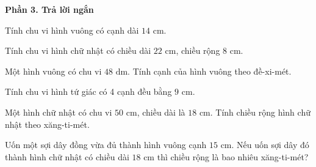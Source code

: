 \textbf{Phần 3. Trả lời ngắn}

\begin{ex} %
Tính chu vi hình vuông có cạnh dài $14\text{ cm}$.
\end{ex}

\begin{ex} %
Tính chu vi hình chữ nhật có chiều dài $22\text{ cm}$, chiều rộng $8\text{ cm}$.
\end{ex}

\begin{ex} %
Một hình vuông có chu vi $48\text{ dm}$. Tính cạnh của hình vuông theo đề-xi-mét.
\end{ex}

\begin{ex} %
Tính chu vi hình tứ giác có 4 cạnh đều bằng $9\text{ cm}$.
\end{ex}

\begin{ex} %
Một hình chữ nhật có chu vi $50\text{ cm}$, chiều dài là $18\text{ cm}$. Tính chiều rộng hình chữ nhật theo xăng-ti-mét.
\end{ex}

\begin{ex} %
Uốn một sợi dây đồng vừa đủ thành hình vuông cạnh $15\text{ cm}$. Nếu uốn sợi dây đó thành hình chữ nhật có chiều dài $18\text{ cm}$ thì chiều rộng là bao nhiêu xăng-ti-mét?
\end{ex}
